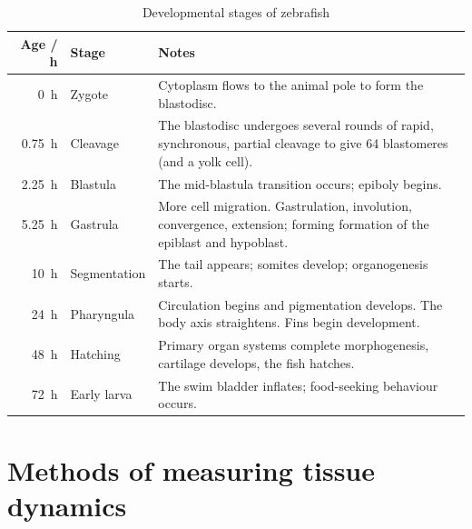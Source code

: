\begin{table}
 \centering
 \begin{tabular*}{\textwidth}{rlp{23em}}
 \toprule
 Age / \SI{}{\hour} & Stage & Notes \\
 \midrule
 \SI{0}{\hour} & Zygote & Cytoplasm flows to the animal pole to form the blastodisc.\\
 \SI{0.75}{\hour} & Cleavage & The blastodisc undergoes several rounds of rapid, synchronous, partial cleavage to give 64 blastomeres (and a yolk cell).\\
 \SI{2.25}{\hour} & Blastula & The mid-blastula transition occurs; epiboly begins.\\
 \SI{5.25}{\hour} & Gastrula & More cell migration. Gastrulation, involution, convergence, extension; forming formation of the epiblast and hypoblast.\\
 \SI{10}{\hour} & Segmentation & The tail appears; somites develop; organogenesis starts. \\
 \SI{24}{\hour} & Pharyngula & Circulation begins and pigmentation develops. The body axis straightens. Fins begin development.\\
 \SI{48}{\hour} & Hatching & Primary organ systems complete morphogenesis, cartilage develops, the fish hatches.\\
 \SI{72}{\hour} & Early larva & The swim bladder inflates; food-seeking behaviour occurs. \\
  \bottomrule
 \end{tabular*}
 \caption{Developmental stages of \gls{zebrafish}}
 \label{tab:zfish_dev}
\end{table}

\section{Methods of measuring tissue dynamics}

